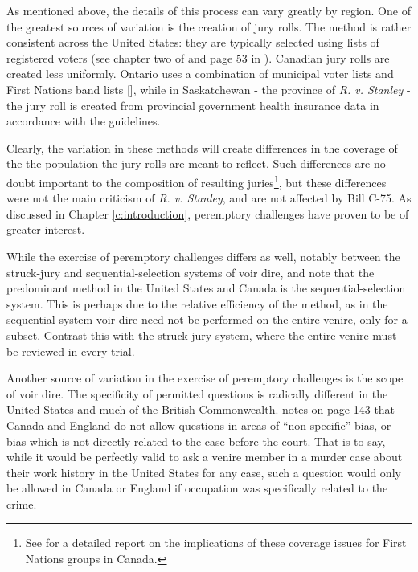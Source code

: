 As mentioned above, the details of this process can vary greatly by region. One of the greatest sources of variation is the
creation of jury rolls. The method is rather consistent across the United States: they are typically selected using lists of
registered voters (see chapter two of \cite{vandykejurysel} and page
53 in \cite{hansvidjudging}). Canadian jury rolls are created less uniformly. Ontario uses a combination of municipal voter lists and First Nations band lists [\cite{ontariojuryroll}],
while in Saskatchewan - the province of \textit{R. v. Stanley} - the jury roll is created from provincial government health
insurance data in accordance with the \cite{saskjuryact} guidelines.

Clearly, the variation in these methods will create differences in the coverage of the the population the jury rolls are meant to
reflect. Such differences are no doubt important to the composition of resulting juries\footnote{See \cite{iacobuccireport} for a
  detailed report on the implications of these coverage issues for First Nations groups in Canada.}, but these differences were not
the main criticism of \textit{R. v. Stanley}, and are not affected by Bill C-75. As discussed in Chapter \ref{c:introduction},
peremptory challenges have proven to be of greater interest.

While the exercise of peremptory challenges differs as well, notably between the struck-jury and
sequential-selection systems of voir dire, \cite{ford2010} and \cite{vandykejurysel} note that the predominant method in the
United States and Canada is the sequential-selection system. This is perhaps due to the relative efficiency of the method, as in
the sequential system voir dire need not be performed on the entire venire, only for a subset. Contrast this with the struck-jury
system, where the entire venire must be reviewed in every trial.

Another source of variation in the exercise of peremptory challenges is the scope of voir dire. The specificity of permitted
questions is radically different in the United States and much of the British Commonwealth. \cite{vandykejurysel} notes on page
143 that Canada and England do not allow questions in areas of ``non-specific'' bias, or bias which is not directly
related to the case before the court. That is to say, while it would be perfectly valid to ask a venire member in a murder case
about their work history in the United States for any case, such a question would only be allowed in Canada or England
if occupation was specifically related to the crime.

